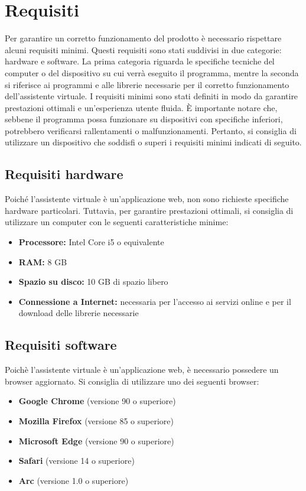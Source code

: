 \section{Requisiti}
Per garantire un corretto funzionamento del prodotto è necessario rispettare alcuni requisiti minimi. Questi requisiti sono stati suddivisi in due categorie: hardware e software. La prima categoria riguarda le specifiche tecniche del computer o del dispositivo su cui verrà eseguito il programma, mentre la seconda si riferisce ai programmi e alle librerie necessarie per il corretto funzionamento dell'assistente virtuale.
I requisiti minimi sono stati definiti in modo da garantire prestazioni ottimali e un'esperienza utente fluida. È importante notare che, sebbene il programma possa funzionare su dispositivi con specifiche inferiori, potrebbero verificarsi rallentamenti o malfunzionamenti. Pertanto, si consiglia di utilizzare un dispositivo che soddisfi o superi i requisiti minimi indicati di seguito.

\subsection{Requisiti hardware}
Poiché l'assistente virtuale è un'applicazione web, non sono richieste specifiche hardware particolari. Tuttavia, per garantire prestazioni ottimali, si consiglia di utilizzare un computer con le seguenti caratteristiche minime:
\begin{itemize}
    \item \textbf{Processore:} Intel Core i5 o equivalente
    \item \textbf{RAM:} 8 GB
    \item \textbf{Spazio su disco:} 10 GB di spazio libero
    \item \textbf{Connessione a Internet:} necessaria per l'accesso ai servizi online e per il download delle librerie necessarie
\end{itemize}

\subsection{Requisiti software}
Poichè l'assistente virtuale è un'applicazione web, è necessario possedere un browser aggiornato. Si consiglia di utilizzare uno dei seguenti browser:
\begin{itemize}
    \item \textbf{Google Chrome} (versione 90 o superiore)
    \item \textbf{Mozilla Firefox} (versione 85 o superiore)
    \item \textbf{Microsoft Edge} (versione 90 o superiore)
    \item \textbf{Safari} (versione 14 o superiore)
    \item \textbf{Arc} (versione 1.0 o superiore)
\end{itemize}